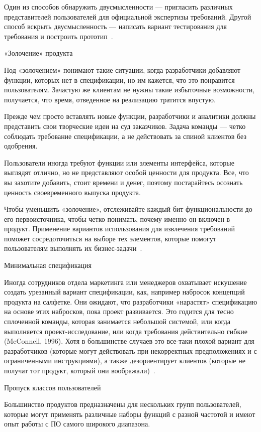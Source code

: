 \documentclass{../industrial-development}
\begin{document}
{Один из способов обнаружить двусмысленности — пригласить различных представителей пользователей для официальной экспертизы требований. Другой способ вскрыть двусмысленность — написать вариант тестирования для требования и построить прототип~\cite[с.~18]{Wiegers}.

\alert{«Золочение» продукта}

Под «золочением» понимают такие ситуации, когда разработчики добавляют функции, которых нет в спецификации, но им кажется, что это понравится пользователям. Зачастую же клиентам не нужны такие избыточные возможности, получается, что время, отведенное на реализацию тратится впустую.

Прежде чем просто вставлять новые функции,
разработчики и аналитики должны представить свои творческие идеи на суд заказчиков. Задача команды — четко соблюдать требование спецификации, а не действовать за спиной клиентов без одобрения.

Пользователи иногда требуют функции или элементы интерфейса, которые выглядят отлично, но не представляют особой ценности для продукта. Все, что вы захотите добавить, стоит времени и денег, поэтому постарайтесь осознать ценность своевременного выпуска продукта. 

Чтобы уменьшить «золочение», отслеживайте каждый бит функциональности до его первоисточника, чтобы четко понимать, почему именно он включен в продукт. Применение вариантов использования
для извлечения требований поможет сосредоточиться на выборе тех элементов, которые помогут пользователям выполнять их бизнес-задачи~\cite[с.~18-19]{Wiegers}.

\alert{Минимальная спецификация}

Иногда сотрудников отдела маркетинга или менеджеров охватывает искушение создать урезанный вариант спецификации, как, например набросок концепций продукта на салфетке. Они ожидают, что разработчики «нарастят» спецификацию на основе этих набросков, пока проект развивается. Это годится для тесно сплоченной команды, которая занимается небольшой системой, или когда выполняется проект-исследование, или когда требования действительно гибкие (McConnell, 1996). Хотя в большинстве случаев это все-таки плохой вариант для разработчиков (которые могут действовать при некорректных предположениях и с ограниченными инструкциями), а также дезориентирует клиентов (которые не получат тот продукт, который они воображали)~\cite[с.~19]{Wiegers}.

\alert{Пропуск классов пользователей}

Большинство продуктов предназначены для нескольких групп пользователей, которые могут применять различные наборы функций с разной частотой и имеют опыт работы с ПО самого широкого диапазона.

}
\end{document}
